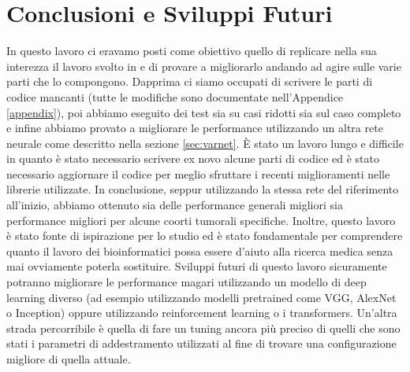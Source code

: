 \section{Conclusioni e Sviluppi Futuri}
\label{sec:conclusion}
In questo lavoro ci eravamo posti come obiettivo quello di replicare nella sua interezza il lavoro svolto
in \cite{lyu2018deep} e di provare a migliorarlo andando ad agire sulle varie parti che lo compongono.
Dapprima ci siamo occupati di scrivere le parti di codice mancanti (tutte le modifiche sono documentate 
nell'Appendice \ref{appendix}), poi abbiamo eseguito dei test sia su casi ridotti sia sul caso completo 
e infine abbiamo provato a migliorare le performance utilizzando un altra rete neurale come 
descritto nella sezione \ref{sec:varnet}.
È stato un lavoro lungo e difficile in quanto è stato necessario scrivere ex novo alcune parti di codice 
ed è stato necessario aggiornare il codice per meglio sfruttare i recenti miglioramenti nelle librerie
utilizzate.
In conclusione, seppur utilizzando la stessa rete del riferimento all'inizio, abbiamo ottenuto sia delle
performance generali migliori sia performance migliori per alcune coorti tumorali specifiche. 
Inoltre, questo lavoro è stato fonte di ispirazione per lo studio ed è stato fondamentale per comprendere
quanto il lavoro dei bioinformatici possa essere d'aiuto alla ricerca medica senza mai ovviamente 
poterla sostituire.
Sviluppi futuri di questo lavoro sicuramente potranno migliorare le performance magari 
utilizzando un modello di deep learning diverso (ad esempio utilizzando modelli pretrained come VGG, 
AlexNet o Inception) oppure utilizzando reinforcement learning o i transformers.  
Un'altra strada percorribile è quella di fare un tuning ancora più preciso di quelli che sono stati i parametri
di addestramento utilizzati al fine di trovare una configurazione migliore di quella attuale.